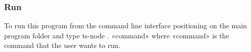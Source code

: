 \subsubsection{Run}
To run this program from the command line interface positioning on the main program folder and type ts-node . «command» where «command» is the command that the user wants to run.
